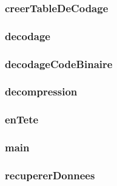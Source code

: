  \subsubsection{creerTableDeCodage}
 

 \subsubsection{decodage}
 

 \subsubsection{decodageCodeBinaire}
 

 \subsubsection{decompression}
 

 \subsubsection{enTete}
 

 \subsubsection{main}
 

 \subsubsection{recupererDonnees}
 
